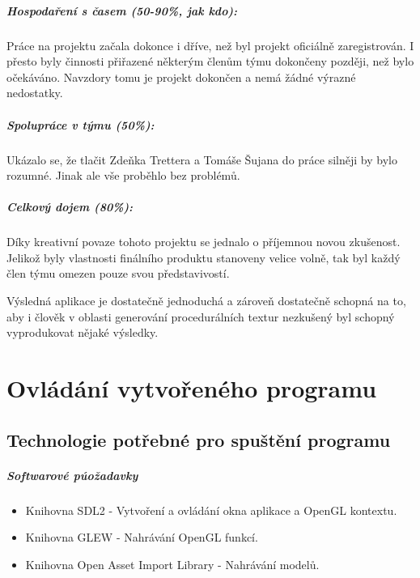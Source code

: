 \documentclass[12pt,a4paper,titlepage,final]{report}
\begin{document}
\paragraph{Hospodaření s časem (50-90\%, jak kdo):} Práce na projektu začala dokonce i dříve, než byl projekt oficiálně zaregistrován. I přesto byly činnosti přiřazené některým členům týmu dokončeny později, než bylo očekáváno. Navzdory tomu je projekt dokončen a nemá žádné výrazné nedostatky.

\paragraph{Spolupráce v týmu (50\%):} Ukázalo se, že tlačit Zdeňka Trettera a Tomáše Šujana do práce silněji by bylo rozumné. Jinak ale vše proběhlo bez problémů.

\paragraph{Celkový dojem (80\%):} Díky kreativní povaze tohoto projektu se jednalo o příjemnou novou zkušenost. Jelikož byly vlastnosti finálního produktu stanoveny velice volně, tak byl každý člen týmu omezen pouze svou představivostí. 

Výsledná aplikace je dostatečně jednoduchá a zároveň dostatečně schopná na to, aby i člověk v oblasti generování procedurálních textur nezkušený byl schopný vyprodukovat nějaké výsledky.

\chapter{Ovládání vytvořeného programu}

\section{Technologie potřebné pro spuštění programu}
\paragraph{Softwarové púožadavky}
\begin{itemize}
	\item Knihovna SDL2 - Vytvoření a ovládání okna aplikace a OpenGL kontextu.
	\item Knihovna GLEW - Nahrávání OpenGL funkcí.
	\item Knihovna Open Asset Import Library - Nahrávání modelů.
\end{itemize}
\end{document}

